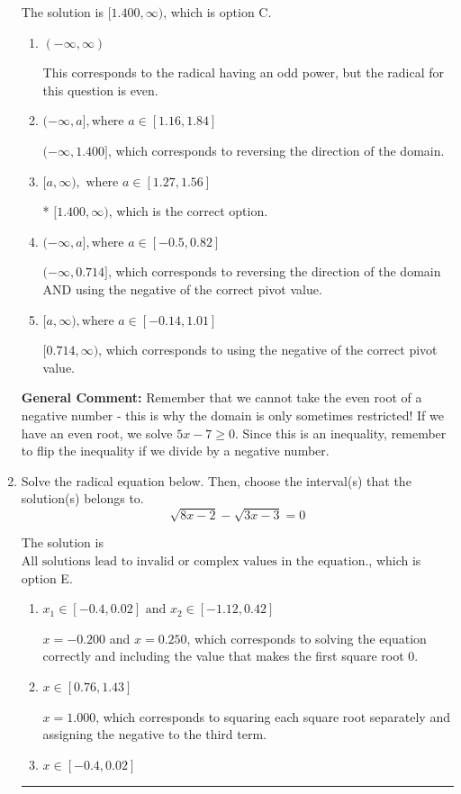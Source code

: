 \documentclass{extbook}[14pt]
\newcommand{\litem}[1]{\item #1

\rule{\textwidth}{0.4pt}}
\begin{document}
\begin{enumerate}
{The solution is \( [1.400, \infty) \), which is option C.\begin{enumerate}[label=\Alph*.]
\item \( (-\infty, \infty) \)

This corresponds to the radical having an odd power, but the radical for this question is even.
\item \( (-\infty, a], \text{where } a \in [1.16, 1.84] \)

 $(-\infty, 1.400]$, which corresponds to reversing the direction of the domain.
\item \( [a, \infty), \text{ where } a \in [1.27, 1.56] \)

* $[1.400, \infty)$, which is the correct option.
\item \( (-\infty, a], \text{where } a \in [-0.5, 0.82] \)

$(-\infty, 0.714]$, which corresponds to reversing the direction of the domain AND using the negative of the correct pivot value.
\item \( [a, \infty), \text{where } a \in [-0.14, 1.01] \)

$[0.714, \infty)$, which corresponds to using the negative of the correct pivot value.
\end{enumerate}

\textbf{General Comment:} Remember that we cannot take the even root of a negative number - this is why the domain is only sometimes restricted! If we have an even root, we solve $5 x - 7 \geq 0$. Since this is an inequality, remember to flip the inequality if we divide by a negative number.
}
\litem{
Solve the radical equation below. Then, choose the interval(s) that the solution(s) belongs to.
\[ \sqrt{8 x - 2} - \sqrt{3 x - 3} = 0 \]

The solution is \( \text{All solutions lead to invalid or complex values in the equation.} \), which is option E.\begin{enumerate}[label=\Alph*.]
\item \( x_1 \in [-0.4, 0.02] \text{ and } x_2 \in [-1.12,0.42] \)

$x = -0.200$ and $x = 0.250$, which corresponds to solving the equation correctly and including the value that makes the first square root 0.
\item \( x \in [0.76,1.43] \)

$x = 1.000$, which corresponds to squaring each square root separately and assigning the negative to the third term.
\item \( x \in [-0.4,0.02] \)


\end{enumerate}}
\end{enumerate}
\end{document}
